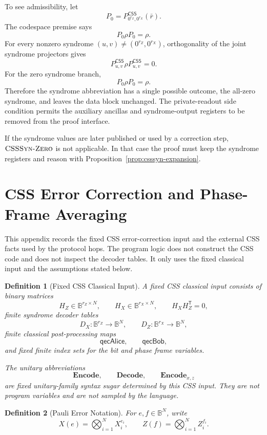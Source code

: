 \documentclass[acmsmall,screen,review,anonymous,nonacm]{acmart}
\newtheorem{definition}{Definition}[section]
\theoremstyle{defn_style}
\begin{document}
To see admissibility, let
\[
P_0
=
P^{\mathsf{CSS}}_{0^{r_Z},0^{r_X}}(\bar r).
\]
The codespace premise says
\[
P_0\rho P_0=\rho.
\]
For every nonzero syndrome \((u,v)\ne(0^{r_Z},0^{r_X})\), orthogonality of the
joint syndrome projectors gives
\[
P^{\mathsf{CSS}}_{u,v}\rho P^{\mathsf{CSS}}_{u,v}=0.
\]
For the zero syndrome branch,
\[
P_0\rho P_0=\rho.
\]
Therefore the syndrome abbreviation has a single possible outcome, the
all-zero syndrome, and leaves the data block unchanged. The private-readout
side condition permits the auxiliary ancillas and syndrome-output registers to
be removed from the proof interface.

If the syndrome values are later published or used by a correction step,
\(\textsc{CSSSyn-Zero}\) is not applicable. In that case the proof must keep
the syndrome registers and reason with
Proposition~\ref{prop:csssyn-expansion}.

\section{CSS Error Correction and Phase-Frame Averaging}
\label{app:css-correction}

This appendix records the fixed CSS error-correction input and the external CSS
facts used by the protocol hops. The program logic does not construct the CSS
code and does not inspect the decoder tables. It only uses the fixed classical
input and the assumptions stated below.

\begin{definition}[Fixed CSS Classical Input]
\label{def:fixed-css-input}
A fixed CSS classical input consists of binary matrices
\[
H_Z\in\mathbb B^{r_Z\times N},
\qquad
H_X\in\mathbb B^{r_X\times N},
\qquad
H_XH_Z^{\mathsf T}=0,
\]
finite syndrome decoder tables
\[
D_X:\mathbb B^{r_Z}\to\mathbb B^N,
\qquad
D_Z:\mathbb B^{r_X}\to\mathbb B^N,
\]
finite classical post-processing maps
\[
\mathsf{qecAlice},
\qquad
\mathsf{qecBob},
\]
and fixed finite index sets for the bit and phase frame variables.

The unitary abbreviations
\[
\mathbf{Encode},
\qquad
\mathbf{Decode},
\qquad
\mathbf{Encode}_{x,z}
\]
are fixed unitary-family syntax sugar determined by this CSS input. They are
not program variables and are not sampled by the language.
\end{definition}

\begin{definition}[Pauli Error Notation]
For \(e,f\in\mathbb B^N\), write
\[
X(e)=\bigotimes_{i=1}^{N}X_i^{e_i},
\qquad
Z(f)=\bigotimes_{i=1}^{N}Z_i^{f_i}.
\]
\end{definition}
\end{document}
